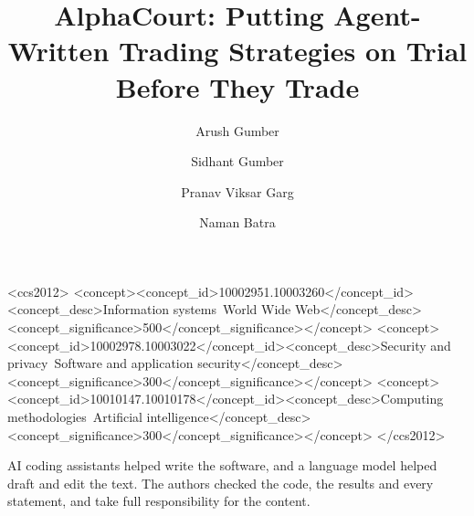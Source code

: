 \documentclass[sigconf, screen, review]{acmart}
\begin{document}

\title{AlphaCourt: Putting Agent-Written Trading Strategies on Trial Before They Trade}

\author{Arush Gumber}

\author{Sidhant Gumber}

\author{Pranav Viksar Garg}

\author{Naman Batra}

\begin{abstract}

\end{abstract}

\begin{CCSXML}
<ccs2012>
<concept><concept_id>10002951.10003260</concept_id><concept_desc>Information systems~World Wide Web</concept_desc><concept_significance>500</concept_significance></concept>
<concept><concept_id>10002978.10003022</concept_id><concept_desc>Security and privacy~Software and application security</concept_desc><concept_significance>300</concept_significance></concept>
<concept><concept_id>10010147.10010178</concept_id><concept_desc>Computing methodologies~Artificial intelligence</concept_desc><concept_significance>300</concept_significance></concept>
</ccs2012>
\end{CCSXML}


\maketitle







\begin{acks}
AI coding assistants helped write the software, and a language model helped draft and edit the text. The authors checked the code, the results and every statement, and take full responsibility for the content.
\end{acks}



\end{document}
